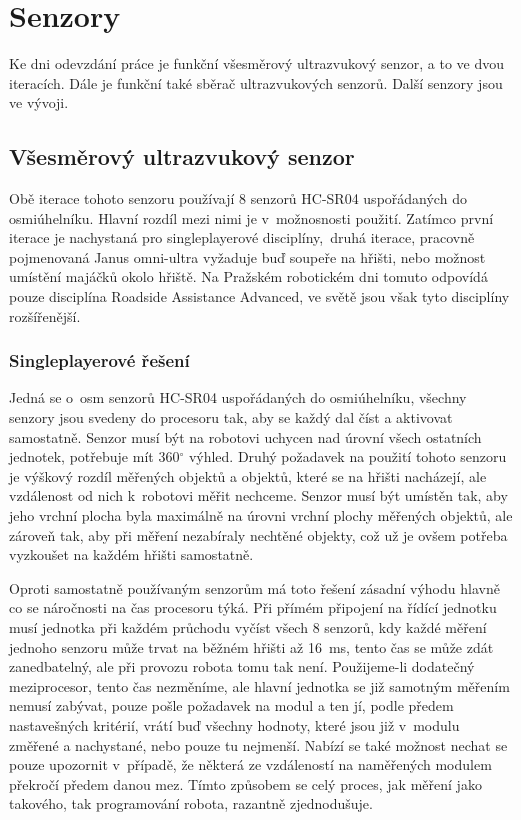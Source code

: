 \chapter{Senzory}
Ke dni odevzdání práce je funkční všesměrový ultrazvukový senzor, a to ve dvou iteracích.
Dále je funkční také sběrač ultrazvukových senzorů.
Další senzory jsou ve vývoji.

\section{Všesměrový ultrazvukový senzor}
Obě iterace tohoto senzoru používají 8 senzorů HC-SR04 uspořádaných do osmiúhelníku.
Hlavní rozdíl mezi nimi je v~možnosnosti použití.
Zatímco první iterace je nachystaná pro singleplayerové disciplíny,~druhá iterace, pracovně pojmenovaná Janus omni-ultra vyžaduje buď soupeře na hřišti, nebo možnost umístění majáčků okolo hřiště. 
Na Pražském robotickém dni tomuto odpovídá pouze disciplína Roadside Assistance Advanced, ve světě jsou však tyto disciplíny rozšířenější.

\subsection{Singleplayerové řešení}
Jedná se o~osm senzorů HC-SR04 uspořádaných do osmiúhelníku, všechny senzory jsou svedeny do procesoru tak, aby se každý dal číst a aktivovat samostatně.
Senzor musí být na robotovi uchycen nad úrovní všech ostatních jednotek, potřebuje mít 360$^{\circ}$ výhled.
Druhý požadavek na použití tohoto senzoru je výškový rozdíl měřených objektů a objektů, které se na hřišti nacházejí, ale vzdálenost od nich k~robotovi měřit nechceme.
Senzor musí být umístěn tak, aby jeho vrchní plocha byla maximálně na úrovni vrchní plochy měřených objektů, ale zároveň tak, aby při měření nezabíraly nechtěné objekty, což už je ovšem potřeba vyzkoušet na každém hřišti samostatně.

Oproti samostatně používaným senzorům má toto řešení zásadní výhodu hlavně co se náročnosti na čas procesoru týká.
Při přímém připojení na řídící jednotku musí jednotka při každém průchodu vyčíst všech 8 senzorů, kdy každé měření jednoho senzoru může trvat na běžném hřišti až 16~ms, tento čas se může zdát zanedbatelný, ale při provozu robota tomu tak není.
Použijeme-li dodatečný meziprocesor, tento čas nezměníme, ale hlavní jednotka se již samotným měřením nemusí zabývat, pouze pošle požadavek na modul a ten jí, podle předem nastavešných kritérií, vrátí buď všechny hodnoty, které jsou již v~modulu změřené a nachystané, nebo pouze tu nejmenší.
Nabízí se také možnost nechat se pouze upozornit v~případě, že některá ze vzdáleností na naměřených modulem překročí předem danou mez.
Tímto způsobem se celý proces, jak měření jako takového, tak programování robota, razantně zjednodušuje.  

